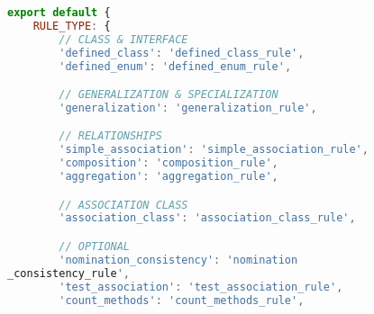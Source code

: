 \begin{lstlisting}[caption={Rules Definition JSON}, label={lst:rules_def}, language=javascript]
export default {
    RULE_TYPE: {
        // CLASS & INTERFACE
        'defined_class': 'defined_class_rule',
        'defined_enum': 'defined_enum_rule',

        // GENERALIZATION & SPECIALIZATION
        'generalization': 'generalization_rule',

        // RELATIONSHIPS
        'simple_association': 'simple_association_rule',
        'composition': 'composition_rule',
        'aggregation': 'aggregation_rule',

        // ASSOCIATION CLASS
        'association_class': 'association_class_rule',

        // OPTIONAL
        'nomination_consistency': 'nomination
_consistency_rule',
        'test_association': 'test_association_rule',
        'count_methods': 'count_methods_rule',


\end{lstlisting}
